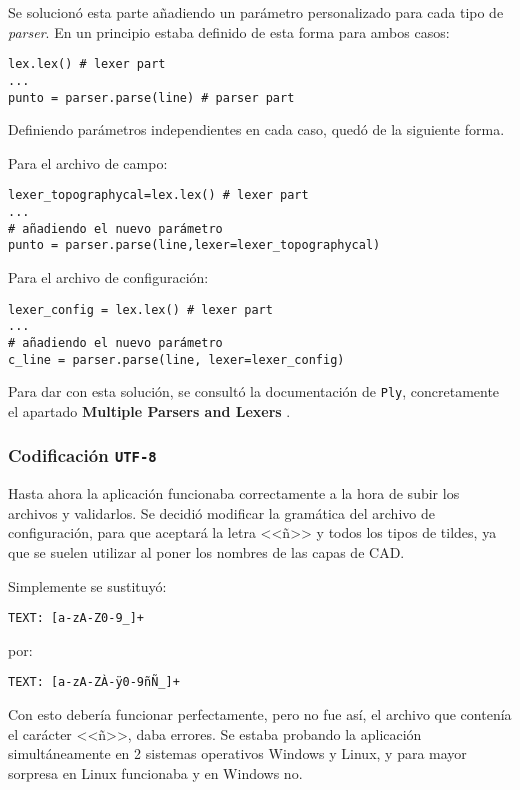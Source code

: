 Se solucionó esta parte añadiendo un parámetro personalizado para cada tipo de \emph{parser}. En un principio estaba definido de esta forma para ambos casos:
\

\begin{lstlisting}
lex.lex() # lexer part
...
punto = parser.parse(line) # parser part
\end{lstlisting}

Definiendo parámetros independientes en cada caso, quedó de la siguiente forma.

Para el archivo de campo:

\begin{lstlisting}
lexer_topographycal=lex.lex() # lexer part
...
# añadiendo el nuevo parámetro
punto = parser.parse(line,lexer=lexer_topographycal)
\end{lstlisting}
\newpage
Para el archivo de configuración:

\begin{lstlisting}
lexer_config = lex.lex() # lexer part
...
# añadiendo el nuevo parámetro
c_line = parser.parse(line, lexer=lexer_config)
\end{lstlisting}
Para dar con esta solución, se consultó la documentación de \texttt{Ply}, concretamente el apartado \textbf{Multiple Parsers and Lexers} \cite{Parser}.


\subsubsection{Codificación \texttt{UTF-8}}

Hasta ahora la aplicación funcionaba correctamente a la hora de subir los archivos y validarlos. Se decidió modificar la gramática del archivo de configuración, para que aceptará la letra <<ñ>> y todos los tipos de tildes, ya que se suelen utilizar al poner los nombres de las capas de CAD. 

Simplemente se sustituyó:

\begin{verbatim}
TEXT: [a-zA-Z0-9_]+
\end{verbatim}

por: 

\begin{verbatim}
TEXT: [a-zA-ZÀ-ÿ0-9ñÑ_]+
\end{verbatim}


Con esto debería funcionar perfectamente, pero no fue así, el archivo que contenía el carácter <<ñ>>, daba errores. Se estaba probando la aplicación simultáneamente en 2 sistemas operativos Windows y Linux, y para mayor sorpresa en Linux funcionaba y en Windows no.

